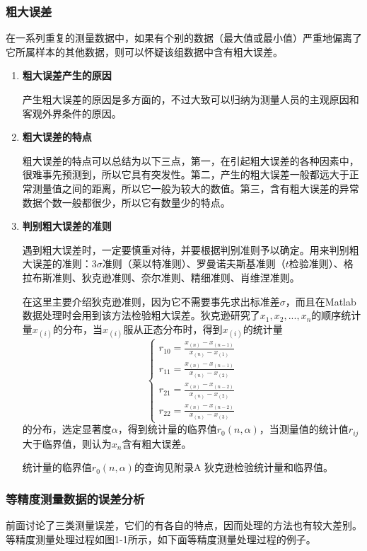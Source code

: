 \subsubsection{粗大误差}
在一系列重复的测量数据中，如果有个别的数据（最大值或最小值）严重地偏离了它所属样本的其他数据，则可以怀疑该组数据中含有粗大误差。
\begin{enumerate}
	\item \textbf{粗大误差产生的原因}
	
	\qquad 产生粗大误差的原因是多方面的，不过大致可以归纳为测量人员的主观原因和客观外界条件的原因。
	\item \textbf{粗大误差的特点}
	
	\qquad 粗大误差的特点可以总结为以下三点，第一，在引起粗大误差的各种因素中，很难事先预测到，所以它具有突发性。第二，产生的粗大误差一般都远大于正常测量值之间的距离，所以它一般为较大的数值。第三，含有粗大误差的异常数据个数一般都很少，所以它有数量少的特点。
	\item \textbf{判别粗大误差的准则}
	
	\qquad 遇到粗大误差时，一定要慎重对待，并要根据判别准则予以确定。用来判别粗大误差的准则：$ 3\sigma $准则（莱以特准则）、罗曼诺夫斯基准则（$ t $检验准则）、格拉布斯准则、狄克逊准则、奈尔准则、精细准则、肖维涅准则。
	
	\qquad 在这里主要介绍狄克逊准则，因为它不需要事先求出标准差$ \sigma $，而且在Matlab数据处理时会用到该方法检验粗大误差。狄克逊研究了$ x_1,x_2,...,x_n $的顺序统计量$ x_{(i)} $的分布，当$ x_{(i)} $服从正态分布时，得到$ x_{(i)} $的统计量
	\begin{equation}\begin{cases}
		r_{10}=\frac{x_{(n)}-x_{(n-1)}}{x_{(n)}-x_{(1)}}\\
		r_{11}=\frac{x_{(n)}-x_{(n-1)}}{x_{(n)}-x_{(2)}}\\
		r_{21}=\frac{x_{(n)}-x_{(n-2)}}{x_{(n)}-x_{(2)}}\\
		r_{22}=\frac{x_{(n)}-x_{(n-2)}}{x_{(n)}-x_{(3)}}
	\end{cases}\end{equation}
	的分布，选定显著度$ \alpha $，得到统计量的临界值$ r_0(n,\alpha) $，当测量值的统计值$ r_{ij} $大于临界值，则认为$ x_n $含有粗大误差。
	
	\qquad 统计量的临界值$ r_0(n,\alpha) $的查询见附录A 狄克逊检验统计量和临界值。
\end{enumerate}

\subsubsection{等精度测量数据的误差分析}
前面讨论了三类测量误差，它们的有各自的特点，因而处理的方法也有较大差别。等精度测量处理过程如图1-1所示，如下面等精度测量处理过程的例子。
